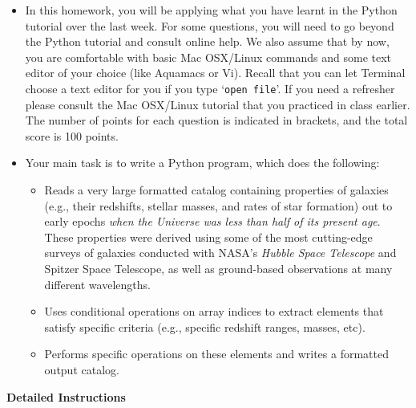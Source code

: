 \documentclass[11pt]{article}    %
\begin{document}
\begin{itemize}
\item 
\noindent
In this homework, you will be applying what you have learnt in the
Python tutorial over the last week. For some questions, you will need
to go beyond the Python tutorial and consult online help. 
We also assume that by now, you are comfortable with basic Mac OSX/Linux commands 
and some text editor of your choice (like Aquamacs or Vi). Recall that you can let 
Terminal choose a text editor for you if you type `{\tt{open file}}'. If you need
a refresher please consult the Mac OSX/Linux tutorial that you 
practiced in class earlier. The number of points for each question is indicated in brackets,
and the total score is 100 points.

\item 
\noindent
Your main task is to write a Python program, which does the following: 

\vspace{-3mm}
\begin{itemize}
\item 
\noindent
Reads a  very large formatted catalog containing properties
of galaxies (e.g., their redshifts, stellar masses,  and rates of star
formation) out  to early epochs  {\it {when the Universe was less than 
half of its present age}}.
These properties were  derived using some of the most
cutting-edge surveys of galaxies conducted with NASA's 
{\it {Hubble Space Telescope}}  and  Spitzer Space Telescope,
as well as  ground-based observations at many different wavelengths.

\item 
\noindent 
Uses conditional operations on array indices to extract elements 
that satisfy specific criteria  (e.g., specific redshift ranges,
masses,  etc).

\item  
\noindent 
Performs specific operations on these elements and writes a
formatted output catalog.

\end{itemize}
\end{itemize}



\begin{center}
\vspace{3.0 mm}
\noindent
{\bf{ Detailed Instructions}}
\end{center}
\end{document}
